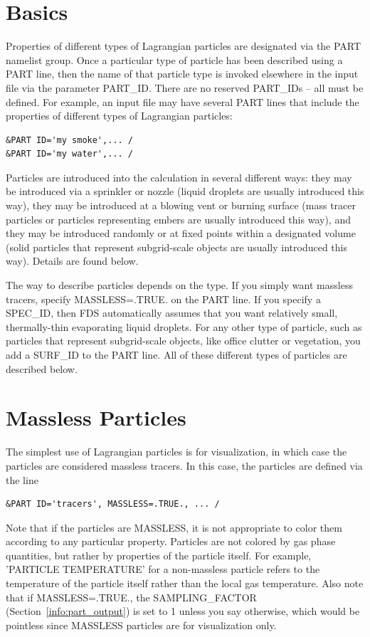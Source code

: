 \documentclass[11pt]{book}
\begin{document}
\section{Basics}
\label{info:PART_Basics}

Properties of different types of
Lagrangian particles are designated via the {\ct PART} namelist group.
Once a particular type of particle has been described using
a {\ct PART} line, then the name of that particle type is invoked
elsewhere in the input file via the parameter {\ct PART\_ID}. There are no reserved {\ct PART\_ID}s -- all must be defined.
For example, an input file may have several {\ct PART} lines that include the
properties of different types of Lagrangian particles:
\begin{lstlisting}
&PART ID='my smoke',... /
&PART ID='my water',... /
\end{lstlisting}
Particles are introduced into the calculation in several different ways: they may be introduced via a sprinkler or nozzle (liquid droplets are usually introduced this way), they may be introduced at a blowing vent or burning surface (mass tracer particles or particles representing embers are usually introduced this way), and they may be introduced randomly or at fixed points within a designated volume (solid particles that represent subgrid-scale objects are usually introduced this way). Details are found below.

The way to describe particles depends on the type.
If you simply want massless tracers, specify {\ct MASSLESS=.TRUE.} on the {\ct PART} line. If you specify a {\ct SPEC\_ID}, then FDS automatically assumes that you want relatively small, thermally-thin evaporating liquid droplets. For any other type of particle, such as particles that represent subgrid-scale objects, like office clutter or vegetation, you add a {\ct SURF\_ID} to the {\ct PART} line. All of these different types of particles are described below.


\section{Massless Particles}
\label{info:MASSLESS}

The simplest use of Lagrangian particles is for visualization, in which case the
particles are considered massless tracers. In this case, the particles are
defined via the line
\begin{lstlisting}
&PART ID='tracers', MASSLESS=.TRUE., ... /
\end{lstlisting}
Note that if the particles are {\ct MASSLESS}, it is not appropriate to color them according to any particular property. Particles are not colored by gas phase quantities, but rather by properties of the particle itself. For example, {\ct 'PARTICLE TEMPERATURE'} for a non-massless particle refers to the temperature of the particle itself rather than the local gas temperature. Also note that if {\ct MASSLESS=.TRUE.}, the {\ct SAMPLING\_FACTOR} (Section~\ref{info:part_output}) is set to 1 unless you say otherwise, which would be pointless
since {\ct MASSLESS} particles are for visualization only.
\end{document}
